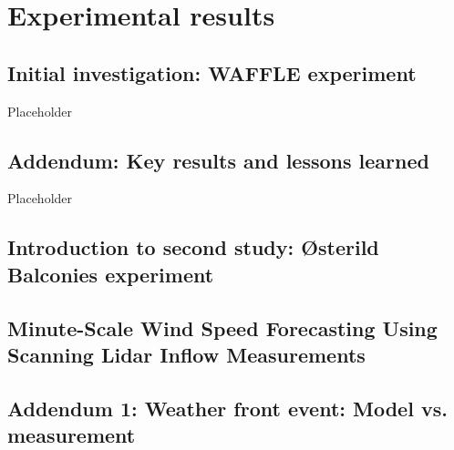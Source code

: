 \chapter{Experimental results}
\label{sec:results}

\clearpage
\section{Initial investigation: WAFFLE experiment}
\label{sec:waffle}

Placeholder

\clearpage
\section{Addendum: Key results and lessons learned}
\label{sec:waffle_addendum}

Placeholder

\clearpage
\section{Introduction to second study: \newline 
{\O}sterild Balconies experiment}
\label{sec:balcony_intro}

\begin{comment}
Necessary to measure at zero elevation angle
Avoid influence from terrain and vegetation
Similar to offshore conditions
Scope of NEWA project fit well into this thesis
\end{comment}

\clearpage
\section{Minute-Scale Wind Speed Forecasting Using Scanning Lidar Inflow Measurements}
\label{sec:balcony_paper}



\clearpage
\section{Addendum 1: Weather front event: Model vs. measurement}
\label{sec:balcony_addendum1}

